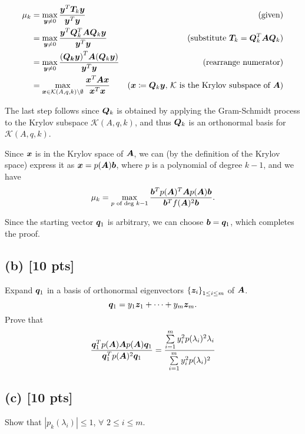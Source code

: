 \documentclass[twoside,10pt]{article}
\begin{document}
\begin{align*}
  \mu_k &= \max\limits_{\vct{y} \neq 0}\dfrac{\vct{y}^T\mtx{T}_k\vct{y}}{\vct{y}^T\vct{y}}&\text{(given)}\\
  &= \max\limits_{\vct{y} \neq 0}\dfrac{\vct{y}^T\mtx{Q}_k^T \mtx{A}\mtx{Q}_k\vct{y}}{\vct{y}^T\vct{y}}&\text{(substitute $\mtx{T}_k = \mtx{Q}^T_k \mtx{A} \mtx{Q}_k$)}\\
  &= \max\limits_{\vct{y} \neq 0}\dfrac{\left(\mtx{Q_k}\vct{y}\right)^T \mtx{A}\left(\mtx{Q}_k\vct{y}\right)}{\vct{y}^T\vct{y}}&\text{(rearrange numerator)}\\
  &= \max\limits_{\vct{x} \in \mathcal{K}(A,q,k) \setminus \emptyset}\dfrac{\vct{x}^T \mtx{A}\vct{x}}{\vct{x}^T\vct{x}}&\text{($\vct{x} \coloneqq \mtx{Q}_k\vct{y}$, $\mathcal{K}$ is the Krylov subspace of $\mtx{A}$)}\\
\end{align*}

The last step follows since $\bm{Q}_k$ is obtained by applying the Gram-Schmidt process to the Krylov subspace $\mathcal{K}(A,q,k)$, and thus $\bm{Q}_k$ is an orthonormal basis for $\mathcal{K}(A,q,k)$.

Since $\bm{x}$ is in the Krylov space of $\bm{A}$, we can (by the definition of the Krylov space) express it as $\bm{x} = p(\bm{A})\bm{b}$, where $p$ is a polynomial of degree $k - 1$, and we have
$$\mu_k = \max \limits_{p \text{ of deg } k - 1} \frac{\bm{b}^T p(\bm{A})^T\bm{A} p(\bm{A})\bm{b}}{\bm{b}^T f(\bm{A})^2\bm{b}}.$$

Since the starting vector $\bm{q}_1$ is arbitrary, we can choose $\bm{b} = \bm{q}_1$, which completes the proof.

\subsection*{(b) [10 pts]}
Expand $\bm{q}_1$ in a basis of orthonormal eigenvectors $\left\{\vct{z}_i\right\}_{1 \leq i \leq m}$ of $\bm{A}$.
\begin{equation}
  \bm{q}_1 = y_1 \bm{z}_1 + \dots + y_m \bm{z}_m. 
\end{equation}
Prove that 
\begin{equation}
  \frac{\bm{q}_1^T p(\bm{A}) \bm{A} p(\bm{A}) \bm{q}_1}{\bm{q}_1^T p(\bm{A})^2 \bm{q}_1} = \frac{\sum \limits_{i = 1}^{m} y_{i}^2 p(\lambda_i)^2 \lambda_{i}}{\sum \limits_{i = 1}^{m} y_{i}^2 p(\lambda_i)^2}
\end{equation}

\subsection*{(c) [10 pts]}
Show that $|p_k(\lambda_i)| \leq 1$, $\forall$ $2 \leq i \leq m$. 
\end{document}
